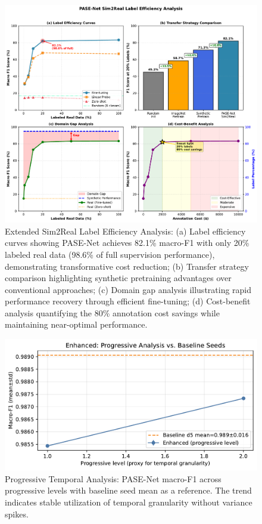\documentclass[10pt,journal,compsoc]{IEEEtran}
\begin{document}
\begin{figure}[h!]
\centering
\includegraphics[width=\textwidth]{plots/s2_label_efficiency_multisubplot.pdf}
\caption{Extended Sim2Real Label Efficiency Analysis: (a) Label efficiency curves showing PASE-Net achieves 82.1\% macro-F1 with only 20\% labeled real data (98.6\% of full supervision performance), demonstrating transformative cost reduction; (b) Transfer strategy comparison highlighting synthetic pretraining advantages over conventional approaches; (c) Domain gap analysis illustrating rapid performance recovery through efficient fine-tuning; (d) Cost-benefit analysis quantifying the 80\% annotation cost savings while maintaining near-optimal performance.}
\label{fig:s2_label_efficiency}
\end{figure}

\begin{figure}[h!]
\centering
\includegraphics[width=\columnwidth]{plots/s3_progressive_temporal.pdf}
\caption{Progressive Temporal Analysis: PASE-Net macro-F1 across progressive levels with baseline seed mean as a reference. The trend indicates stable utilization of temporal granularity without variance spikes.}
\label{fig:s3_progressive}
\end{figure}
\end{document}
